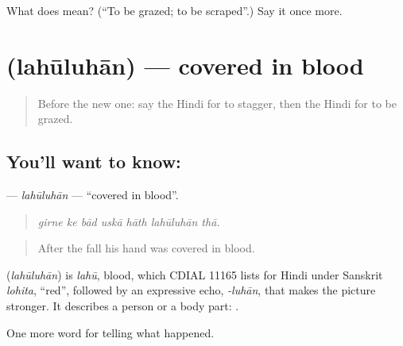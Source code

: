 \begin{tcolorbox}[breakable,colback=teal!4,colframe=teal!35!black,title={Before you move on}]
What does  mean? (\textquotedblleft{}To be grazed; to be scraped\textquotedblright{}.) Say it once more.
\end{tcolorbox}
\section[\texorpdfstring{\hi{लहूलुहान} (lahūluhān)}{लहूलुहान (lahūluhān)}]{ (lahūluhān) — covered in blood}

\label{lesson:HI-C297-lahuluhan}



\begin{quote}
Before the new one: say the Hindi for to stagger, then the Hindi for to be grazed.
\end{quote}

\subsection*{You'll want to know: }
\textbf{} — \emph{lahūluhān} — \textquotedblleft{}covered in blood\textquotedblright{}.

\begin{quote}
      
\end{quote}

\begin{quote}
\emph{girne ke bād uskā hāth lahūluhān thā.}
\end{quote}

\begin{quote}
After the fall his hand was covered in blood.
\end{quote}

\begin{cousinweb}
\textbf{} (\emph{lahūluhān}) is \emph{lahū}, blood, which CDIAL 11165 lists for Hindi under Sanskrit \emph{lohita}, \textquotedblleft{}red\textquotedblright{}, followed by an expressive echo, \emph{-luhān}, that makes the picture stronger. It describes a person or a body part: \textbf{  }.
\end{cousinweb}

\begin{grammarlens}[title={What you've built}]
One more word for telling what happened.
\end{grammarlens}

